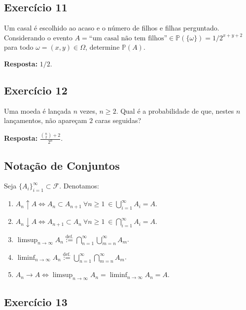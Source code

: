 \documentclass[
  letterpaper,
  DIV=11,
  numbers=noendperiod]{scrartcl}
\begin{document}
\hypertarget{exercuxedcio-11}{%
\subsection{Exercício 11}\label{exercuxedcio-11}}

Um casal é escolhido ao acaso e o número de filhos e filhas perguntado.
Considerando o evento
\(A=\text{``um casal não tem filhos''}\in\mathbb{P}(\{\omega\})=1/2^{x+y+2}\)
para todo \(\omega=(x,y)\in\Omega\), determine \(\mathbb{P}(A)\).

\textbf{Resposta:} \(1/2\).

\hypertarget{exercuxedcio-12}{%
\subsection{Exercício 12}\label{exercuxedcio-12}}

Uma moeda é lançada \(n\) vezes, \(n\geqslant 2\). Qual é a
probabilidade de que, nestes \(n\) lançamentos, não apareçam \(2\) caras
seguidas?

\textbf{Resposta:} \(\frac{{n\choose 2}+2}{2^{n}}\).

\hypertarget{notauxe7uxe3o-de-conjuntos}{%
\subsection{Notação de Conjuntos}\label{notauxe7uxe3o-de-conjuntos}}

Seja \(\{A_{i}\}_{i=1}^{\infty}\subset\mathscr{F}\). Denotamos:

\begin{enumerate}
\def\labelenumi{(\Roman{enumi})}
\item
  \(A_{n}\uparrow A\iff A_{n}\subset A_{n+1}\ \forall n\geqslant 1\ \in\bigcup_{i=1}^{\infty}A_{i}=A\).
\item
  \(A_{n}\downarrow A\iff A_{n+1}\subset A_{n}\ \forall n\geqslant 1\ \in\bigcap_{i=1}^{\infty}A_{i}=A\).
\item
  \(\limsup_{n\to\infty}A_{n}\stackrel{{\mathrm{def.}}}{{:=}}\bigcap_{n=1}^{\infty}\bigcup_{m=n}^{\infty}A_{m}\).
\item
  \(\liminf_{n\to\infty}A_{n}\stackrel{{\mathrm{def.}}}{{:=}}\bigcup_{n=1}^{\infty}\bigcap_{m=n}^{\infty}A_{m}\).
\item
  \(A_{n}\to A\iff\limsup_{n\to\infty}A_{n}=\liminf_{n\to\infty}A_{n}=A\).
\end{enumerate}

\hypertarget{exercuxedcio-13}{%
\subsection{Exercício 13}\label{exercuxedcio-13}}
\end{document}

